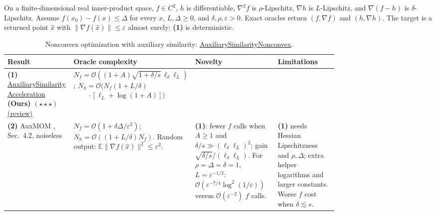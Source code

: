 \begin{table}[tp]
\centering
\caption{Nonconvex optimization with auxiliary similarity: \href{https://github.com/k3nfalt/longtails/blob/main/LongTails/Setups/AuxiliarySimilarityNonconvex.lean}{AuxiliarySimilarityNonconvex}.}\label{tab:AuxiliarySimilarityNonconvex}
\parbox{\linewidth}{\footnotesize On a finite-dimensional real inner-product space, $f\in C^2$, $h$ is differentiable, $\nabla^2 f$ is $\rho$-Lipschitz, $\nabla h$ is $L$-Lipschitz, and $\nabla(f-h)$ is $\delta$-Lipschitz. Assume $f(x_0)-f(x)\leq\Delta$ for every $x$, $L,\Delta\geq0$, and $\delta,\rho,\varepsilon>0$. Exact oracles return $(f,\nabla f)$ and $(h,\nabla h)$. The target is a returned point $\hat x$ with $\|\nabla f(\hat x)\|\leq\varepsilon$ almost surely; \textbf{(1)} is deterministic.}\par\smallskip
\begin{threeparttable}
\footnotesize
\setlength{\tabcolsep}{4pt}\renewcommand{\arraystretch}{1.25}
\begin{tabularx}{\linewidth}{@{}>{\raggedright\arraybackslash}p{0.20\linewidth}>{\raggedright\arraybackslash}p{0.32\linewidth}>{\raggedright\arraybackslash}p{0.25\linewidth}>{\raggedright\arraybackslash}X@{}}
\toprule
\textbf{Result} & \textbf{Oracle complexity} & \textbf{Novelty} & \textbf{Limitations} \\
\midrule
\textbf{(1)} \href{https://github.com/k3nfalt/longtails/blob/main/LongTails/Theorems/AuxiliarySimilarityAcceleration.lean}{Auxiliary\allowbreak{}Similarity\allowbreak{}Acceleration} \textbf{(Ours)} $(\star\star\star)$ \href{https://github.com/k3nfalt/longtails/blob/main/scripts/reviews/AuxiliarySimilarityAcceleration.md}{(review)} &
$N_f=\mathcal{O}((1+A)\sqrt{1+\delta/s}\,\ell_\delta\ell_L)$;\newline
$N_h=\mathcal{O}(N_f(1+L/\delta)$\newline $\qquad\cdot[\ell_L+\log(1+A)])$ & & \\
\midrule[1.2pt]
\textbf{(2)} AuxMOM \citep{asnChaytiV5}, Sec.~4.2, noiseless &
$N_f=\mathcal{O}(1+\delta\Delta/\varepsilon^2)$;\newline
$N_h=\mathcal{O}((1+L/\delta)N_f)$.
Random output: $\mathbb E\|\nabla f(\hat x)\|^2\leq\varepsilon^2$. &
\textbf{(1)}: fewer $f$ calls when $A\geq1$ and $\delta/s\gg(\ell_\delta\ell_L)^2$; gain $\sqrt{\delta/s}/(\ell_\delta\ell_L)$. For $\rho=\Delta=\delta=1$, $L=\varepsilon^{-1/2}$: $\mathcal{O}(\varepsilon^{-7/4}\log^2(1/\varepsilon))$ versus $\mathcal{O}(\varepsilon^{-2})$ $f$ calls. &
\textbf{(1)} needs Hessian Lipschitzness and $\rho,\Delta$; extra helper logarithms and larger constants. Worse $f$ cost when $\delta\lesssim s$. \\

\end{tabularx}
\end{threeparttable}
\end{table}
